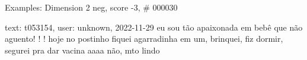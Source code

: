 \begin{frame}{Examples: Dimension 2 neg, score -3, \# 000030}
\footnotesize
\begin{alertblock}{text: t053154, user: unknown, 2022-11-29}
eu sou tão apaixonada em bebê que não aguento! ! ! hoje no postinho fiquei 
agarradinha em um, brinquei, fiz dormir, segurei pra dar vacina 
  
\textbf{} aaaa não, mto lindo 
\end{alertblock}
\end{frame}
